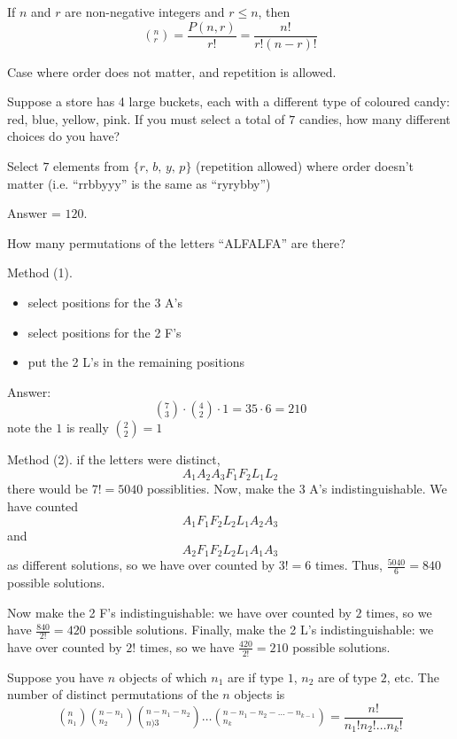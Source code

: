 \begin{theorm}
    If $n$ and $r$ are non-negative integers and $r\leq n$, then $$\left(^n_r\right) = \frac{P(n,r)}{r!} = \frac{n!}{r!(n-r)!}$$
\end{theorm}

Case where order does not matter, and repetition is allowed.

\begin{example}
    Suppose a store has 4 large buckets, each with a different type of coloured candy: red, blue, yellow, pink. If you must select a total of $7$ candies, how many different choices do you have?

    Select $7$ elements from $\{r,\,b,\,y,\,p\}$ (repetition allowed) where order doesn't matter (i.e. ``rrbbyyy'' is the same as ``ryrybby'')

    Answer = $120$.
\end{example}

\newpage
\begin{example}
    How many permutations of the letters ``ALFALFA'' are there?

    Method (1).
    \begin{itemize}
        \item select positions for the 3 A's
        \item select positions for the 2 F's
        \item put the 2 L's in the remaining positions
    \end{itemize}

    Answer: $$\left(^7_3\right) \cdot \left(^4_2\right) \cdot 1 = 35 \cdot 6 = 210$$ note the $1$ is really $\left(^2_2\right) = 1$


    Method (2). if the letters were distinct, $$A_1 A_2 A_3 F_1 F_2 L_1 L_2$$ there would be $7! = 5040$ possiblities. Now, make the 3 A's indistinguishable. We have counted $$A_1 F_1 F_2 L_2 L_1 A_2 A_3$$ and $$A_2 F_1 F_2 L_2 L_1 A_1 A_3$$ as different solutions, so we have over counted by $3! = 6$ times. Thus, $\frac{5040}{6} = 840$ possible solutions.

    Now make the 2 F's indistinguishable: we have over counted by $2$ times, so we have $\frac{840}{2!} = 420$ possible solutions. Finally, make the 2 L's indistinguishable: we have over counted by $2!$ times, so we have $\frac{420}{2!} = 210$ possible solutions.
\end{example}

\begin{theorm}
    Suppose you have $n$ objects of which $n_1$ are if type $1$, $n_2$ are of type $2$, etc. The number of distinct permutations of the $n$ objects is $$\left(^n_{n_1}\right)\left(^{n-n_1}_{n_2}\right)\left(^{n-n_1-n_2}_{n)3}\right)\dots\left(^{n-n_1-n_2-\dots -n_{k-1}}_{n_k}\right) = \frac{n!}{n_1!n_2!\dots n_k!}$$
\end{theorm}

